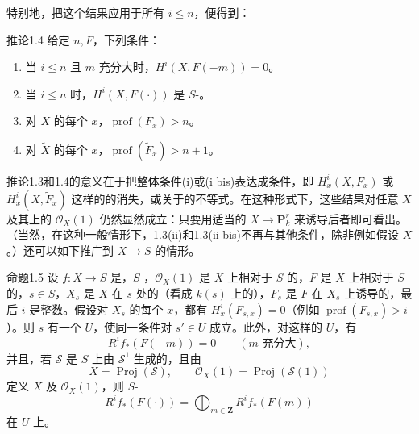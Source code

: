 特别地，把这个结果应用于所有 $i\leq n$，便得到：
\begin{SGAresult}{推论}{1.4}
给定 $n,F$，下列条件：
\begin{enumerate}
\item[(i)] 当 $i\leq n$ 且 $m$ 充分大时，$H^i(X,F(-m))=0$。
\item[(i bis)] 当 $i\leq n$ 时，$H^i(X,F(\cdot))$ 是 $S$-。
\item[(ii)] 对 $X$ 的每个 $x$，$\operatorname{prof}(F_x)>n$。
\item[(iii)] 对 $\widetilde X$ 的每个 $x$，$\operatorname{prof}(\widetilde F_x)>n+1$。
\end{enumerate}
\end{SGAresult}
推论1.3和1.4的意义在于把整体条件(i)或(i bis)表达成条件，即 $H^i_x(X,F_x)$ 或 $H^i_x(X,\widetilde F_x)$ 这样的的消失，或关于的不等式。在这种形式下，这些结果对任意 $X$ 及其上的 $\mathcal O_X(1)$ 仍然显然成立：只要用适当的 $X\to\mathbf P_k^r$ 来诱导后者即可看出。（当然，在这种一般情形下，1.3(ii)和1.3(ii bis)不再与其他条件，除非例如假设 $X$ 。）还可以如下推广到 $X\to S$ 的情形。
\begin{SGAresult}{命题}{1.5}
设 $f:X\to S$ 是，$S$ ，$\mathcal O_X(1)$ 是 $X$ 上相对于 $S$ 的，$F$ 是 $X$ 上相对于 $S$ 的，$s\in S$，$X_s$ 是 $X$ 在 $s$ 处的（看成 $k(s)$ 上的），$F_s$ 是 $F$ 在 $X_s$ 上诱导的，最后 $i$ 是整数。假设对 $X_s$ 的每个 $x$，都有 $H^i_x(F_{s,x})=0$（例如 $\operatorname{prof}(F_{s,x})>i$）。则 $s$ 有一个 $U$，使同一条件对 $s'\in U$ 成立。此外，对这样的 $U$，有
\[
 R^if_*(F(-m))=0\qquad(m\text{ 充分大}),
\]
并且，若 $\mathscr S$ 是 $S$ 上由 $\mathscr S^1$ 生成的，且由
\[
 X=\operatorname{Proj}(\mathscr S),\qquad \mathcal O_X(1)=\operatorname{Proj}(\mathscr S(1))
\]
定义 $X$ 及 $\mathcal O_X(1)$，则 $S$-
\[
 R^if_*(F(\cdot))=\bigoplus_{m\in\mathbf Z}R^if_*(F(m))
\]
在 $U$ 上。
\end{SGAresult}
